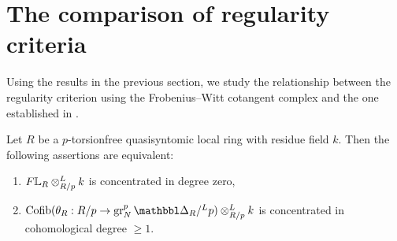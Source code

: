 \documentclass[11pt,a4paper]{amsart}
\begin{document}
\section{The comparison of regularity criteria}
Using the results in the previous section, we study the relationship between the regularity criterion using the Frobenius--Witt cotangent complex and the one established in \cite{bhatt2023Syntomic}.
\begin{theorem}\label{theorem2.10}
    Let $R$ be a $p$-torsionfree quasisyntomic local ring with residue field $k$. Then the following assertions are equivalent:
    \begin{enumerate}
        \item $F\mathbb{L}_R\otimes^L_{R/p}k$ is concentrated in degree zero,
        \item $\Cofib(\theta_R:R/p\to \gr^p_N\prism_R/^Lp)\otimes_{R/p}^Lk$ is concentrated in cohomological degree $\ge 1$.
    \end{enumerate}
\end{theorem}
\end{document}
